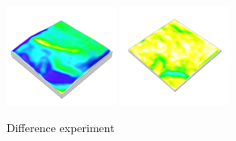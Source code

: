 \documentclass[prodmode,acmtochi]{acmsmall} %
\begin{document}
\begin{figure}[h!]
\begin{center}
		\includegraphics[width=0.32\textwidth]{images/render_3d/mean_slope_4.png}
		\includegraphics[width=0.32\textwidth]{images/render_3d/stdev_slope_4.png}
	\caption{Difference experiment}
	\label{fig:}
\end{center}
\end{figure}
\end{document}
